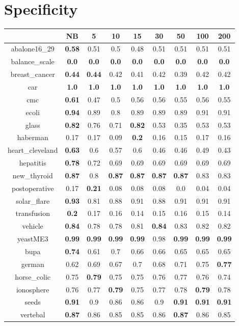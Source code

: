 \documentclass{article}%
\begin{document}
%
\section*{Specificity}%
\begin{tabular}{c|cccccccc}%
\hline%
&NB&5&10&15&30&50&100&200\\%
\hline%
abalone16\_29&\textbf{0.58}&0.51&0.5&0.48&0.51&0.51&0.51&0.51\\%
\hline%
balance\_scale&\textbf{0.0}&\textbf{0.0}&\textbf{0.0}&\textbf{0.0}&\textbf{0.0}&\textbf{0.0}&\textbf{0.0}&\textbf{0.0}\\%
\hline%
breast\_cancer&\textbf{0.44}&\textbf{0.44}&0.42&0.41&0.42&0.39&0.42&0.42\\%
\hline%
car&\textbf{1.0}&\textbf{1.0}&\textbf{1.0}&\textbf{1.0}&\textbf{1.0}&\textbf{1.0}&\textbf{1.0}&\textbf{1.0}\\%
\hline%
cmc&\textbf{0.61}&0.47&0.5&0.56&0.56&0.55&0.56&0.55\\%
\hline%
ecoli&\textbf{0.94}&0.89&0.8&0.89&0.89&0.89&0.91&0.91\\%
\hline%
glass&\textbf{0.82}&0.76&0.71&\textbf{0.82}&0.53&0.35&0.53&0.53\\%
\hline%
haberman&0.17&0.17&0.09&\textbf{0.2}&0.16&0.15&0.17&0.16\\%
\hline%
heart\_cleveland&\textbf{0.63}&0.6&0.57&0.6&0.46&0.46&0.49&0.43\\%
\hline%
hepatitis&\textbf{0.78}&0.72&0.69&0.69&0.69&0.69&0.69&0.69\\%
\hline%
new\_thyroid&\textbf{0.87}&0.8&\textbf{0.87}&\textbf{0.87}&\textbf{0.87}&\textbf{0.87}&0.83&0.83\\%
\hline%
postoperative&0.17&\textbf{0.21}&0.08&0.08&0.08&0.0&0.04&0.04\\%
\hline%
solar\_flare&\textbf{0.93}&0.81&0.88&0.91&0.88&0.91&0.91&0.91\\%
\hline%
transfusion&\textbf{0.2}&0.17&0.16&0.14&0.15&0.16&0.15&0.14\\%
\hline%
vehicle&\textbf{0.84}&0.78&0.78&0.81&\textbf{0.84}&0.83&0.82&0.82\\%
\hline%
yeastME3&\textbf{0.99}&\textbf{0.99}&\textbf{0.99}&\textbf{0.99}&0.98&\textbf{0.99}&\textbf{0.99}&\textbf{0.99}\\%
\hline%
bupa&\textbf{0.74}&0.61&0.7&0.66&0.66&0.65&0.65&0.65\\%
\hline%
german&0.62&0.69&0.67&0.7&0.68&0.71&0.75&\textbf{0.77}\\%
\hline%
horse\_colic&0.75&\textbf{0.79}&0.75&0.75&0.76&0.77&0.76&0.74\\%
\hline%
ionosphere&0.76&0.77&\textbf{0.79}&0.75&0.77&0.78&\textbf{0.79}&0.78\\%
\hline%
seeds&\textbf{0.91}&0.9&0.86&0.86&0.9&\textbf{0.91}&\textbf{0.91}&\textbf{0.91}\\%
\hline%
vertebal&\textbf{0.87}&0.86&0.85&0.85&0.86&\textbf{0.87}&0.86&0.85\\%
\hline%
\end{tabular}
\end{document}
